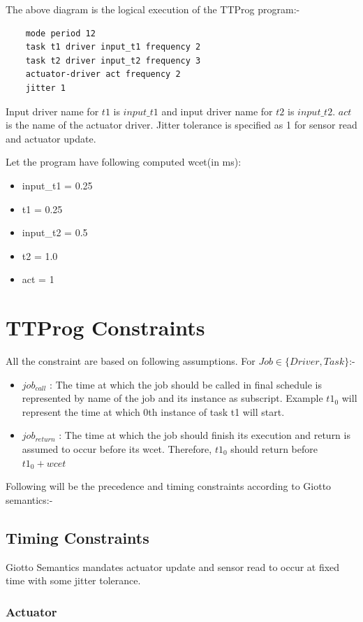 \documentclass[16pt]{report}
\begin{document}
The above diagram is the logical execution of the TTProg program:-
\begin{verbatim}
    mode period 12
    task t1 driver input_t1 frequency 2
    task t2 driver input_t2 frequency 3
    actuator-driver act frequency 2
    jitter 1
\end{verbatim}

Input driver name for $t1$ is $input\_t1$ and input driver name for $t2$ is $input\_t2$. $act$ is the name of the actuator driver. Jitter tolerance is specified as 1 for sensor read and actuator update.

Let the program have following computed wcet(in ms): 
\begin{itemize}
    \item input\_t1 = 0.25
    \item t1 = 0.25
    \item input\_t2 = 0.5
    \item t2 = 1.0
    \item act = 1
\end{itemize}

\section{TTProg Constraints}
All the constraint are based on following assumptions. For $Job \in \{Driver,Task\}$:-
\begin{itemize}
    \item $job_{call}$ : The time at which the job should be called in final schedule is represented by name of the job and its instance as subscript. Example $t1_0$ will represent the time at which 0th instance of task t1 will start.
    \item $job_{return}$ : The time at which the job should finish its execution and return is assumed to occur before its wcet. Therefore, $t1_0$ should return before $t1_0 + wcet$  
\end{itemize}

Following will be the precedence and timing constraints according to Giotto semantics:- 
\subsection{Timing Constraints}
Giotto Semantics mandates actuator update and sensor read to occur at fixed time with some jitter tolerance.

\subsubsection{Actuator}
\end{document}
